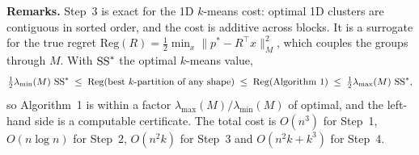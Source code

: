 \newpage
\begin{algorithm}[H]
\caption{Exact 1D $k$-means on sorted values: $O(n^2k)$ time, $O(nk)$ space}
\DontPrintSemicolon
{}
\BlankLine
{}
\end{algorithm}

\medskip\small
\noindent\textbf{Remarks.}
Step~3 is exact for the 1D $k$-means cost: optimal 1D clusters are contiguous in sorted order, and the cost is additive across blocks.
It is a surrogate for the true regret $\mathrm{Reg}(R)=\tfrac12\min_{x}\|p^*-R^\top x\|_M^2$, which couples the groups through $M$.
With $\operatorname{SS}^*$ the optimal $k$-means value,
\[
\tfrac12\lambda_{\min}(M)\,\operatorname{SS}^*\;\le\;\mathrm{Reg}(\text{best $k$-partition of any shape})\;\le\;\mathrm{Reg}(\text{Algorithm 1})\;\le\;\tfrac12\lambda_{\max}(M)\,\operatorname{SS}^*,
\]
so Algorithm~1 is within a factor $\lambda_{\max}(M)/\lambda_{\min}(M)$ of optimal, and the left-hand side is a computable certificate.
The total cost is $O(n^3)$ for Step~1, $O(n\log n)$ for Step~2, $O(n^2k)$ for Step~3 and $O(n^2k+k^3)$ for Step~4.
